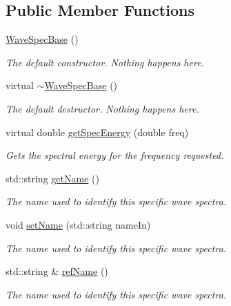 \subsection*{Public Member Functions}
\begin{DoxyCompactItemize}
\item 
\hyperlink{classosea_1_1_wave_spec_base_a2696d8ab7ff4b6f4c2c522f0fd17d378}{Wave\-Spec\-Base} ()
\begin{DoxyCompactList}\small\item\em The default constructor. Nothing happens here. \end{DoxyCompactList}\item 
virtual \hyperlink{classosea_1_1_wave_spec_base_a96ae21bd0d1d6563d741cad248d59906}{$\sim$\-Wave\-Spec\-Base} ()
\begin{DoxyCompactList}\small\item\em The default destructor. Nothing happens here. \end{DoxyCompactList}\item 
virtual double \hyperlink{classosea_1_1_wave_spec_base_ab058570554fed4ad517e355f994bef62}{get\-Spec\-Energy} (double freq)
\begin{DoxyCompactList}\small\item\em Gets the spectral energy for the frequency requested. \end{DoxyCompactList}\item 
std\-::string \hyperlink{classosea_1_1_wave_spec_base_a4a83c895dbd969ad4a70d609b35df0f9}{get\-Name} ()
\begin{DoxyCompactList}\small\item\em The name used to identify this specific wave spectra. \end{DoxyCompactList}\item 
void \hyperlink{classosea_1_1_wave_spec_base_abe33fefbd3debdb3772ab64e1af34ffb}{set\-Name} (std\-::string name\-In)
\begin{DoxyCompactList}\small\item\em The name used to identify this specific wave spectra. \end{DoxyCompactList}\item 
std\-::string \& \hyperlink{classosea_1_1_wave_spec_base_a9210b20185e774ab8f293d647b93698a}{ref\-Name} ()
\begin{DoxyCompactList}\small\item\em The name used to identify this specific wave spectra. \end{DoxyCompactList}\end{DoxyCompactItemize}
